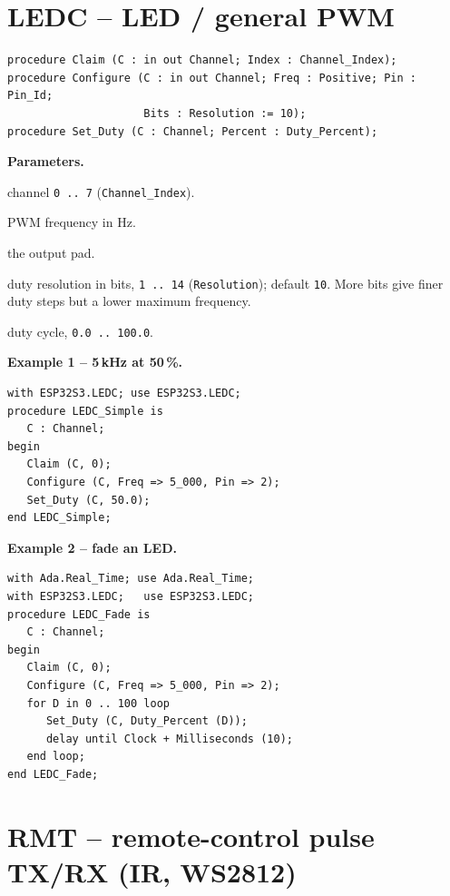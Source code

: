 \section{LEDC -- LED / general PWM}

\begin{lstlisting}
procedure Claim (C : in out Channel; Index : Channel_Index);
procedure Configure (C : in out Channel; Freq : Positive; Pin : Pin_Id;
                     Bits : Resolution := 10);
procedure Set_Duty (C : Channel; Percent : Duty_Percent);
\end{lstlisting}

\textbf{Parameters.}
\begin{description}[style=nextline]
\item[\texttt{Index}] channel \texttt{0\,..\,7} (\texttt{Channel\_Index}).
\item[\texttt{Freq}] PWM frequency in Hz.
\item[\texttt{Pin}] the output pad.
\item[\texttt{Bits}] duty resolution in bits, \texttt{1\,..\,14}
  (\texttt{Resolution}); default \texttt{10}. More bits give finer duty steps but a
  lower maximum frequency.
\item[\texttt{Percent}] duty cycle, \texttt{0.0\,..\,100.0}.
\end{description}

\textbf{Example 1 -- 5\,kHz at 50\,\%.}
\begin{lstlisting}
with ESP32S3.LEDC; use ESP32S3.LEDC;
procedure LEDC_Simple is
   C : Channel;
begin
   Claim (C, 0);
   Configure (C, Freq => 5_000, Pin => 2);
   Set_Duty (C, 50.0);
end LEDC_Simple;
\end{lstlisting}

\textbf{Example 2 -- fade an LED.}
\begin{lstlisting}
with Ada.Real_Time; use Ada.Real_Time;
with ESP32S3.LEDC;   use ESP32S3.LEDC;
procedure LEDC_Fade is
   C : Channel;
begin
   Claim (C, 0);
   Configure (C, Freq => 5_000, Pin => 2);
   for D in 0 .. 100 loop
      Set_Duty (C, Duty_Percent (D));
      delay until Clock + Milliseconds (10);
   end loop;
end LEDC_Fade;
\end{lstlisting}

\section{RMT -- remote-control pulse TX/RX (IR, WS2812)}

